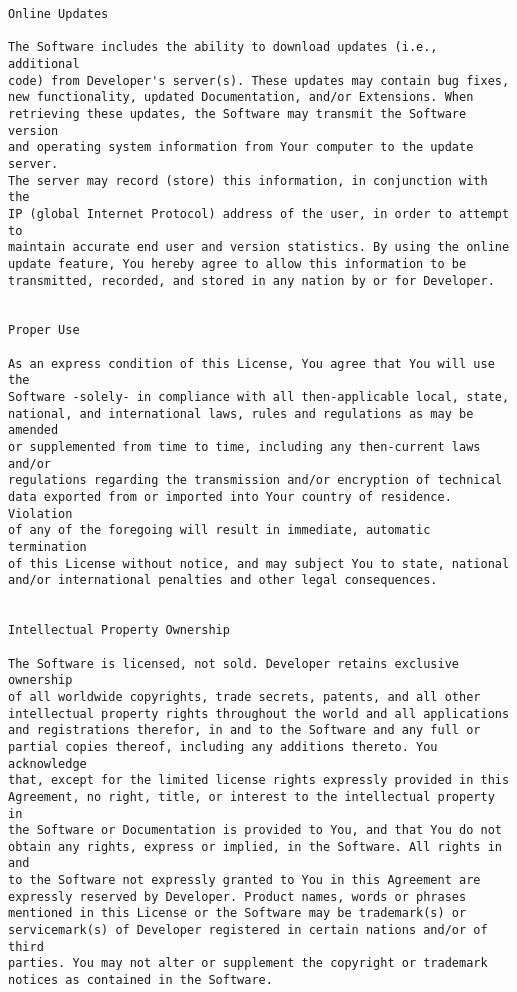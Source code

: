 \documentclass{report}
\begin{document}
{\begin{verbatim}
Online Updates

The Software includes the ability to download updates (i.e., additional 
code) from Developer's server(s). These updates may contain bug fixes, 
new functionality, updated Documentation, and/or Extensions. When 
retrieving these updates, the Software may transmit the Software version 
and operating system information from Your computer to the update server. 
The server may record (store) this information, in conjunction with the 
IP (global Internet Protocol) address of the user, in order to attempt to 
maintain accurate end user and version statistics. By using the online 
update feature, You hereby agree to allow this information to be 
transmitted, recorded, and stored in any nation by or for Developer. 


Proper Use

As an express condition of this License, You agree that You will use the 
Software -solely- in compliance with all then-applicable local, state, 
national, and international laws, rules and regulations as may be amended 
or supplemented from time to time, including any then-current laws and/or 
regulations regarding the transmission and/or encryption of technical 
data exported from or imported into Your country of residence. Violation 
of any of the foregoing will result in immediate, automatic termination 
of this License without notice, and may subject You to state, national 
and/or international penalties and other legal consequences. 


Intellectual Property Ownership

The Software is licensed, not sold. Developer retains exclusive ownership 
of all worldwide copyrights, trade secrets, patents, and all other 
intellectual property rights throughout the world and all applications 
and registrations therefor, in and to the Software and any full or 
partial copies thereof, including any additions thereto. You acknowledge 
that, except for the limited license rights expressly provided in this 
Agreement, no right, title, or interest to the intellectual property in 
the Software or Documentation is provided to You, and that You do not 
obtain any rights, express or implied, in the Software. All rights in and 
to the Software not expressly granted to You in this Agreement are 
expressly reserved by Developer. Product names, words or phrases 
mentioned in this License or the Software may be trademark(s) or 
servicemark(s) of Developer registered in certain nations and/or of third 
parties. You may not alter or supplement the copyright or trademark 
notices as contained in the Software. 



\end{verbatim}}
\end{document}
